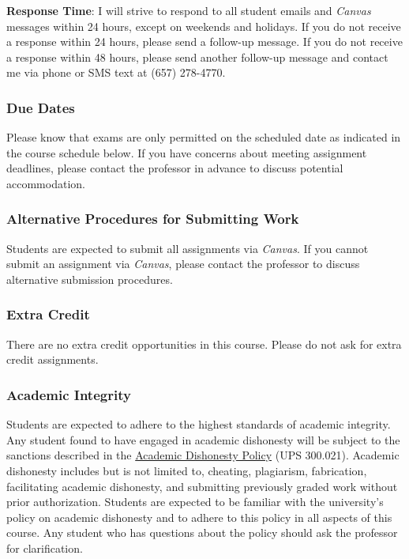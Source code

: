 \documentclass[12pt, letterpaper]{article}
\begin{document}
		\textbf{Response Time}: I will strive to respond to all student emails and \emph{Canvas} messages within 24 hours, except on weekends and holidays. If you do not receive a response within 24 hours, please send a follow-up message. If you do not receive a response within 48 hours, please send another follow-up message and contact me via phone or SMS text at (657) 278-4770.

	\subsubsection*{Due Dates}
		Please know that exams are only permitted on the scheduled date as indicated in the course schedule below. If you have concerns about meeting assignment deadlines, please contact the professor in advance to discuss potential accommodation.

	\subsubsection*{Alternative Procedures for Submitting Work}
		Students are expected to submit all assignments via \emph{Canvas}. If you cannot submit an assignment via \emph{Canvas}, please contact the professor to discuss alternative submission procedures.
	
	\subsubsection*{Extra Credit}
		There are no extra credit opportunities in this course. Please do not ask for extra credit assignments.

	\subsubsection*{Academic Integrity}
		Students are expected to adhere to the highest standards of academic integrity. Any student found to have engaged in academic dishonesty will be subject to the sanctions described in the \href{https://www.fullerton.edu/senate/publications_policies_resolutions/ups/UPS%20300/UPS%20300.021.pdf}{Academic Dishonesty Policy} (UPS 300.021). Academic dishonesty includes but is not limited to, cheating, plagiarism, fabrication, facilitating academic dishonesty, and submitting previously graded work without prior authorization. Students are expected to be familiar with the university's policy on academic dishonesty and to adhere to this policy in all aspects of this course. Any student who has questions about the policy should ask the professor for clarification.
\end{document}
